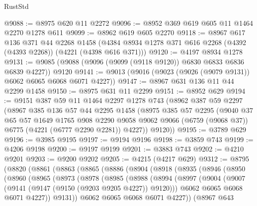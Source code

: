 \begin{lexlean}{RustStd}
\begin{coremodule}
{\begin{coremodule}
{{{{{{{{{{{{{{{{{{{{{{{{{{{{{{{@9088 := @8975 @620 @11 @2272
@9096 := @8952 @369 @619 @605 @11 @1464 @2270 @1278 @611
@9099 := @8962 @619 @605 @2270
@9118 := @8967
    @617
    @136
    @371
    @44
    @2268
    @1458
    (@4384 @8934 @1278 @371 @616 @2268 (@4392 (@4393 @2268)) (@4221 (@4398 @616 @371)))
@9120 := @4197 @8934 @1278
@9131 := @9085 (@9088 (@9096 (@9099 (@9118 @9120)) @6830 @6833 @6836 @6839 @4227)) @9120
@9141 := @9013 (@9016 (@9023 (@9026 (@9079 @9131)) @6062 @6065 @6068 @6071 @4227))
@9147 := @8967 @631 @136 @11 @44 @2299 @1458
@9150 := @8975 @631 @11 @2299
@9151 := @8952 @629
@9194 := @9151
    @387
    @59
    @11
    @1464
    @2297
    @1278
    @743
    (@8962
      @387
      @59
      @2297
      (@8967
        @385
        @136
        @57
        @44
        @2295
        @1458
        (@8975
          @385
          @57
          @2295
          (@9040
            @37
            @65
            @57
            @1649
            @1765
            @908
            @2290
            @9058
            @9062
            @9066
            (@6759 (@9068 @37))
            @6775
            (@4221 (@6777 @2290 @2281))
            @4227))
        @9120))
@9195 := @3789 @629
@9196 := @3985 @9195
@9197 := @9194 @9196
@9198 := @3859 @743
@9199 := @4206 @9198
@9200 := @9197 @9199
@9201 := @3883 @743
@9202 := @4210 @9201
@9203 := @9200 @9202
@9205 := @4215 (@4217 @629)
@9312 := @8795
    (@8820
      (@8861
        (@8863
          (@8865
            (@8886
              (@8904
                (@8918
                  (@8935
                    (@8946
                      (@8950
                        (@8960
                          (@8965
                            (@8973
                              (@8978
                                (@8985
                                  (@8988
                                    (@8994
                                      (@8997
                                        (@9004
                                          (@9007 (@9141 (@9147 (@9150 (@9203 @9205 @4227)) @9120)))
                                          @6062
                                          @6065
                                          @6068
                                          @6071
                                          @4227))
                                      @9131))
                                  @6062
                                  @6065
                                  @6068
                                  @6071
                                  @4227))
                              (@8967
                                @643
}}}}}}}}}}}}}}}}}}}}}}}}}}}}}}}
\end{coremodule}}
\end{coremodule}
\end{lexlean}
